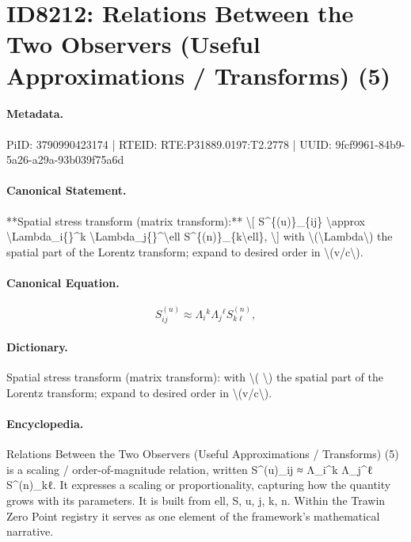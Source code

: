 \section*{ID8212: Relations Between the Two Observers (Useful Approximations / Transforms) (5)}
\paragraph{Metadata.}
PiID: 3790990423174 | RTEID: RTE:P31889.0197:T2.2778 | UUID: 9fcf9961-84b9-5a26-a29a-93b039f75a6d

\paragraph{Canonical Statement.}
**Spatial stress transform (matrix transform):** \textbackslash{}[ S\textasciicircum{}\{(u)\}\_\{ij\} \textbackslash{}approx \textbackslash{}Lambda\_i\{\}\textasciicircum{}k \textbackslash{}Lambda\_j\{\}\textasciicircum{}\textbackslash{}ell S\textasciicircum{}\{(n)\}\_\{k\textbackslash{}ell\}, \textbackslash{}] with \textbackslash{}(\textbackslash{}Lambda\textbackslash{}) the spatial part of the Lorentz transform; expand to desired order in \textbackslash{}(v/c\textbackslash{}).

\paragraph{Canonical Equation.}
\[
S^{(u)}_{ij} \approx \Lambda_i{}^k \Lambda_j{}^\ell S^{(n)}_{k\ell},
\]

\paragraph{Dictionary.}
Spatial stress transform (matrix transform): with \textbackslash{}( \textbackslash{}) the spatial part of the Lorentz transform; expand to desired order in \textbackslash{}(v/c\textbackslash{}).

\paragraph{Encyclopedia.}
Relations Between the Two Observers (Useful Approximations / Transforms) (5) is a scaling / order-of-magnitude relation, written S\textasciicircum{}(u)\_ij ≈ Λ\_i\textasciicircum{}k Λ\_j\textasciicircum{}ℓ S\textasciicircum{}(n)\_kℓ. It expresses a scaling or proportionality, capturing how the quantity grows with its parameters. It is built from ell, S, u, j, k, n. Within the Trawin Zero Point registry it serves as one element of the framework's mathematical narrative.
